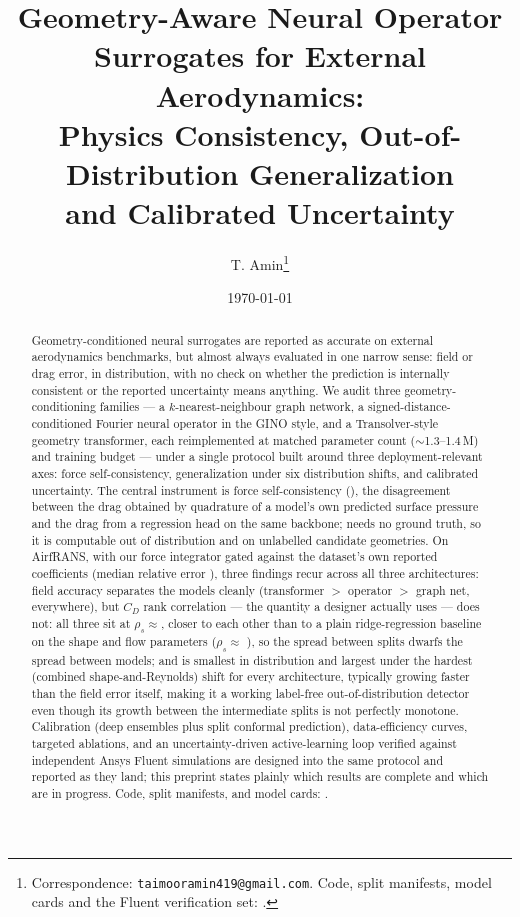 \documentclass[11pt,a4paper]{article}
\title{Geometry-Aware Neural Operator Surrogates for External Aerodynamics:\\
       Physics Consistency, Out-of-Distribution Generalization\\
       and Calibrated Uncertainty}
\author{T. Amin\thanks{Correspondence: \texttt{taimooramin419@gmail.com}. Code,
        split manifests, model cards and the Fluent verification set:
        \todo{repository URL}.}}
\date{\today}
\begin{document}
\maketitle

\begin{abstract}
Geometry-conditioned neural surrogates are reported as accurate on external
aerodynamics benchmarks, but almost always evaluated in one narrow sense: field
or drag error, in distribution, with no check on whether the prediction is
internally consistent or the reported uncertainty means anything. We audit three
geometry-conditioning families --- a $k$-nearest-neighbour graph network, a
signed-distance-conditioned Fourier neural operator in the GINO style, and a
Transolver-style geometry transformer, each reimplemented at matched parameter
count ($\sim$1.3--1.4\,M) and training budget --- under a single protocol built
around three deployment-relevant axes: force self-consistency, generalization
under six distribution shifts, and calibrated uncertainty. The central
instrument is force self-consistency (\FSC), the disagreement between the drag
obtained by quadrature of a model's own predicted surface pressure and the drag
from a regression head on the same backbone; \FSC{} needs no ground truth, so it
is computable out of distribution and on unlabelled candidate geometries. On
AirfRANS, with our force integrator gated against the dataset's own reported
coefficients (median relative error ), three findings
recur across all three architectures: field accuracy separates the models
cleanly (transformer $>$ operator $>$ graph net, everywhere), but $C_D$ rank
correlation --- the quantity a designer actually uses --- does not: all three sit
at $\rho_s\approx$, closer to each other than to a plain
ridge-regression baseline on the shape and flow parameters ($\rho_s\approx$
), so the spread between splits dwarfs the spread between
models; and \FSC{} is smallest in distribution and largest under the hardest
(combined shape-and-Reynolds) shift for every architecture, typically growing
faster than the field error itself, making it a working label-free
out-of-distribution detector even though its growth between the intermediate
splits is not perfectly monotone.
Calibration (deep ensembles plus split conformal prediction), data-efficiency
curves, targeted ablations, and an uncertainty-driven active-learning loop
verified against independent Ansys Fluent simulations are designed into the same
protocol and reported as they land; this preprint states plainly which results
are complete and which are in progress. Code, split manifests, and model cards:
.
\end{abstract}
\end{document}
